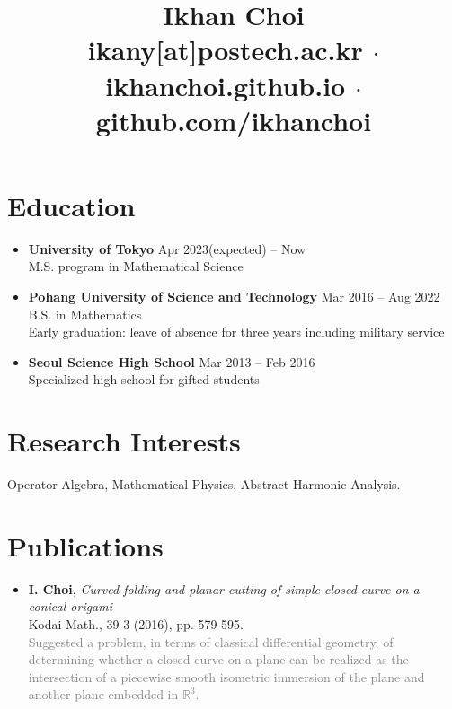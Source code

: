 \documentclass[11pt,a4paper]{article}
\title{\vspace{-40pt}
	Ikhan Choi\\[5pt]
	\small \faEnvelopeSquare\quad ikany[at]postech.ac.kr
	\quad$\cdot$\quad \faHome\quad ikhanchoi.github.io
	\quad$\cdot$\quad \faGithub\quad github.com/ikhanchoi
	\vspace{-5em}}
\date{}
\begin{document}
\maketitle


\section*{Education}
\begin{itemize}
\item
	\textbf{University of Tokyo}
	\hfill{\small Apr 2023(expected) -- Now}\\
	M.S. program in Mathematical Science
\item
	\textbf{Pohang University of Science and Technology}
	\hfill{\small Mar 2016 -- Aug 2022}\\
	B.S. in Mathematics\\
	Early graduation: leave of absence for three years including military service
\item
	\textbf{Seoul Science High School}
	\hfill{\small Mar 2013 -- Feb 2016}\\
	Specialized high school for gifted students
\end{itemize}



\section*{Research Interests}
\hspace{2em}
Operator Algebra, Mathematical Physics, Abstract Harmonic Analysis.



\section*{Publications}
\begin{itemize}
\item
	\textbf{I. Choi},
	\emph{Curved folding and planar cutting of simple closed curve on a conical origami}\\
	Kodai Math., 39-3 (2016), pp. 579-595.\\
	\textcolor{gray}{Suggested a problem, in terms of classical differential geometry, of determining whether a closed curve on a plane can be realized as the intersection of a piecewise smooth isometric immersion of the plane and another plane embedded in $\mathbb{R}^3$.}
\end{itemize}
\end{document}
